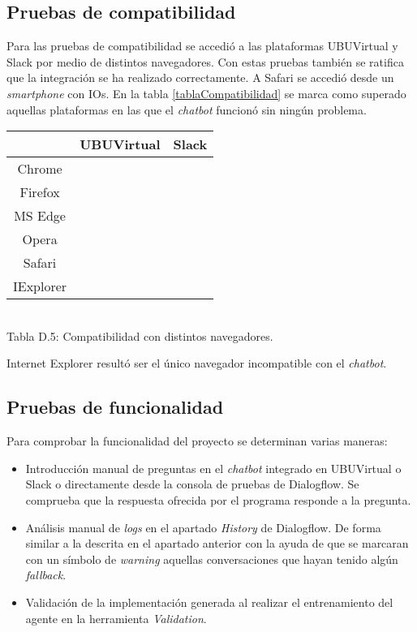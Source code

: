 \subsection{Pruebas de compatibilidad}

Para las pruebas de compatibilidad se accedió a las plataformas UBUVirtual y Slack por medio de distintos navegadores. Con estas pruebas también se ratifica que la integración se ha realizado correctamente.
A Safari se accedió desde un \textit{smartphone} con IOs.
En la tabla \ref{tablaCompatibilidad} se marca como superado aquellas plataformas en las que el \textit{chatbot} funcionó sin ningún problema.

\renewcommand{\arraystretch}{1.2}
	\begin{tabular}{|c|c|c|}  
		\cline{2-3}
		\multicolumn{1}{c|}{} & UBUVirtual & Slack \\
		\hline
		Chrome & \cmark & \cmark \\
		\hline
		Firefox & \cmark & \cmark \\
		\hline
		MS Edge & \cmark & \cmark \\
		\hline
		Opera & \cmark & \cmark \\
		\hline
		Safari & \cmark & \cmark \\
		\hline
		IExplorer & \xmark & \xmark \\
		\hline  
	\end{tabular}\\

Tabla D.5: Compatibilidad con distintos navegadores.
\label{tablaCompatibilidad}

Internet Explorer resultó ser el único navegador incompatible con el \textit{chatbot}.

\subsection{Pruebas de funcionalidad}

Para comprobar la funcionalidad del proyecto se determinan varias maneras:
\begin{itemize}
	\tightlist
	\item 
	Introducción manual de preguntas en el \textit{chatbot} integrado en UBUVirtual o Slack o directamente desde la consola de pruebas de Dialogflow. Se comprueba que la respuesta ofrecida por el programa responde a la pregunta.
	\item 
	Análisis manual de \textit{logs} en el apartado \textit{History} de Dialogflow. De forma similar a la descrita en el apartado anterior con la ayuda de que se marcaran con un símbolo de \textit{warning} aquellas conversaciones que hayan tenido algún \textit{fallback}.
	\item 
	Validación de la implementación generada al realizar el entrenamiento del agente en la herramienta \textit{Validation}.
\end{itemize}

